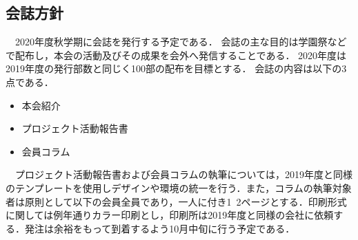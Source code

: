 \subsection*{会誌方針}
　2020年度秋学期に会誌を発行する予定である．
会誌の主な目的は学園祭などで配布し，本会の活動及びその成果を会外へ発信することである．
2020年度は2019年度の発行部数と同じく100部の配布を目標とする．
会誌の内容は以下の3点である．
\begin{itemize}
\item 本会紹介
\item プロジェクト活動報告書
\item 会員コラム
\end{itemize}
　プロジェクト活動報告書および会員コラムの執筆については，2019年度と同様のテンプレートを使用しデザインや環境の統一を行う．また，コラムの執筆対象者は原則として\thirdGrade{}以下の会員全員であり，一人に付き1~2ページとする．印刷形式に関しては例年通りカラー印刷とし，印刷所は2019年度と同様の会社に依頼する．発注は余裕をもって到着するよう10月中旬に行う予定である．

